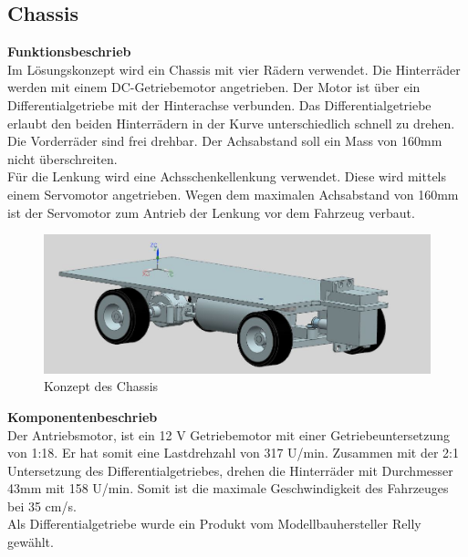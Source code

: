 \subsection{Chassis}

\textbf{Funktionsbeschrieb}
\\[0.2cm]
Im Lösungskonzept wird ein Chassis mit vier Rädern verwendet. Die Hinterräder werden mit einem DC-Getriebemotor angetrieben. Der Motor ist über ein Differentialgetriebe mit der Hinterachse verbunden. Das Differentialgetriebe erlaubt den beiden Hinterrädern in der Kurve unterschiedlich schnell zu drehen. Die Vorderräder sind frei drehbar. Der Achsabstand soll ein Mass von 160mm nicht überschreiten.\\
Für die Lenkung wird eine Achsschenkellenkung verwendet. Diese wird mittels einem Servomotor angetrieben. Wegen dem maximalen Achsabstand von 160mm ist der Servomotor zum Antrieb der Lenkung vor dem Fahrzeug verbaut.
\begin{figure}[H]%
\centering
\includegraphics[width=1\textwidth]{03_Loesungskonzept/pictures/Chassis_2.JPG}
\caption{Konzept des Chassis}
\label{fig:activityRoute}
\end{figure}\flushleft
\textbf{Komponentenbeschrieb}
\\[0.2cm]
Der Antriebsmotor, ist ein 12 V Getriebemotor mit einer Getriebeuntersetzung von 1:18. Er hat somit eine Lastdrehzahl von 317 U/min. Zusammen mit der 2:1 Untersetzung des Differentialgetriebes, drehen die Hinterräder mit Durchmesser 43mm mit 158 U/min. Somit ist die maximale Geschwindigkeit des Fahrzeuges bei 35 cm/s.\\
Als Differentialgetriebe wurde ein Produkt vom Modellbauhersteller Relly gewählt.
